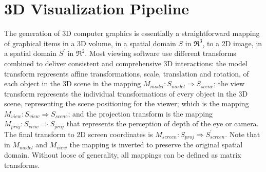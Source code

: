 \section{3D Visualization Pipeline}
\label{sec.visualization_pipeline}




The generation of 3D computer graphics is essentially a straightforward mapping of graphical items in a 3D volume, in a spatial domain $S$ in $\Re^3$, to a 2D image, in a spatial domain $S^{\prime}$ in $\Re^2$. Most viewing software use different transforms combined to deliver consistent and comprehensive 3D interactions: the model transform represents affine transformations, scale, translation and rotation, of each object in the 3D scene in the mapping $M_{model}: S_{model} \Rightarrow S_{scene}$; the view transform represents the individual transformations of every object in the 3D scene, representing the scene positioning for the viewer; which is the mapping $M_{view}: S_{view} \Rightarrow S_{scene}$; and the projection transform is the mapping $M_{proj}:S_{view} \Rightarrow S_{proj}$ that represents the perception of depth of the eye or camera. The final transform to 2D screen coordinates is $M_{screen}:S_{proj} \Rightarrow S^{\prime}_{screen}$. Note that in $M_{model}$ and $M_{view}$ the mapping is inverted to preserve the original spatial domain. Without loose of generality, all mappings can be defined as matrix transforms.


